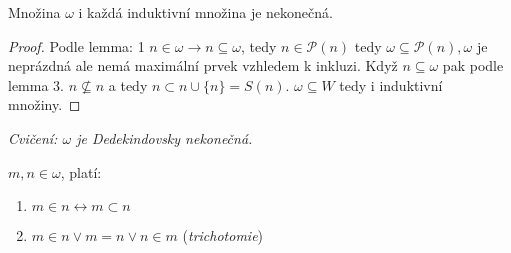 \begin{lemma}
	Množina $\omega$ i každá induktivní množina je nekonečná.
\end{lemma}

\begin{proof}
	Podle lemma: 1 $n \in \omega \rightarrow n \subseteq \omega$, tedy $n \in \mathcal{P}(n)$ tedy $\omega \subseteq \mathcal{P}(n), \omega$ je neprázdná ale nemá maximální prvek vzhledem k inkluzi. Když $n \subseteq \omega$ pak podle lemma 3. $n \nsubseteq n$ a tedy $n \subset n \cup \{n\} = S(n)$. $\omega \subseteq W$ tedy i induktivní množiny.
\end{proof}

\textit{Cvičení: $\omega$ je Dedekindovsky nekonečná.}

\begin{lemma}
	$m,n \in \omega$, platí:
	
	\begin{enumerate}
		\item $m \in n \leftrightarrow m \subset n$
		\item $m \in n \lor m = n \lor n \in m$ (\textit{trichotomie})
	\end{enumerate}
\end{lemma}

